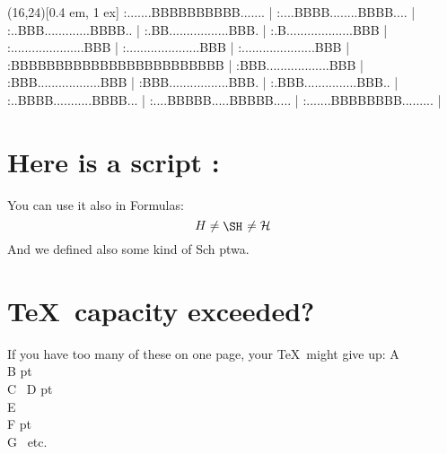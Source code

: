 \def\schwa{\FormOfSchwa\kern 1 pt} %
\sprite{\FormOfSchwa}(16,24)[0.4 em, 1 ex] %
:.......BBBBBBBBBB....... |
:....BBBB........BBBB.... |
:..BBB.............BBBB.. |
:.BB.................BBB. |
:.B...................BBB |
:.....................BBB |
:.....................BBB |
:.....................BBB |
:BBBBBBBBBBBBBBBBBBBBBBBB |
:BBB..................BBB |
:BBB..................BBB |
:BBB.................BBB. |
:.BBB...............BBB.. |
:..BBBB...........BBBB... |
:....BBBBB.....BBBBB..... |
:.......BBBBBBBB......... |
\endsprite
     
\section{Here is a script \protect\ScriptH :} %
You can use it also in Formulas:
$$ H \neq \ScriptH \neq {\cal H}$$
And we defined also some kind of Sch\schwa wa.
     
\newpage
\section{\TeX\ capacity exceeded?}
If you have too many of these on one page, your \TeX\ might give up:
A \ScriptH \\
B \schwa   \\
C \ScriptH \
D \schwa   \\
E \ScriptH \\
F \schwa   \\
G \ScriptH \ etc.


